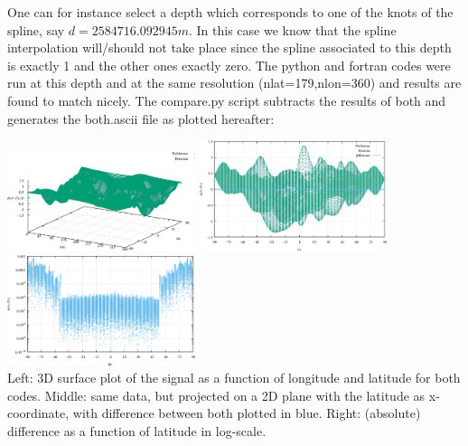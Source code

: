 One can for instance select a depth which corresponds to one of the knots of the spline, 
say $d=2584716.092945\si{m}$.
In this case we know that the spline interpolation will/should not take place since the
spline associated to this depth is exactly 1 and the other ones exactly zero. 
The python and fortran codes were run at this depth and at the same resolution (nlat=179,nlon=360)
and results are found to match nicely. The {\filenamefont compare.py} script subtracts the results 
of both and generates the {\filenamefont both.ascii} file as plotted hereafter:
  

\begin{center}
\includegraphics[width=5.5cm]{python_codes/fieldstone_85/compare/both3D.png}
\includegraphics[width=5.5cm]{python_codes/fieldstone_85/compare/both2D.png}
\includegraphics[width=5.5cm]{python_codes/fieldstone_85/compare/both2Dlog.png}\\
{\captionfont Left: 3D surface plot of the signal as a function of longitude and latitude for 
both codes. Middle: same data, but projected on a 2D plane with the latitude as x-coordinate, 
with difference between both plotted in blue. Right: (absolute) difference as a function 
of latitude in log-scale.}
\end{center}

